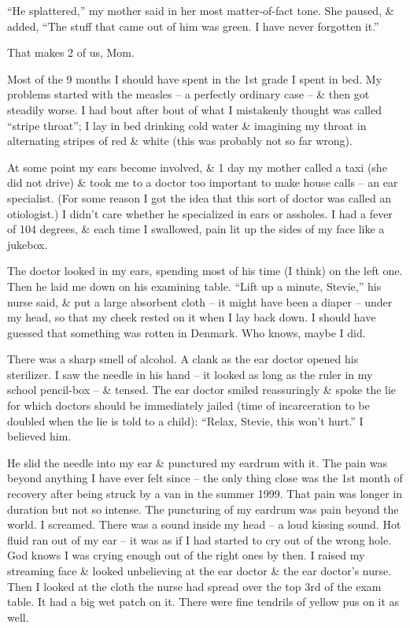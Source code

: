 \documentclass{article}
\numberwithin{equation}{section}
\begin{document}
``He splattered,'' my mother said in her most matter-of-fact tone. She paused, \& added, ``The stuff that came out of him was green. I have never forgotten it.''

That makes 2 of us, Mom.

 Most of the 9 months I should have spent in the 1st grade I spent in bed. My problems started with the measles -- a perfectly ordinary case -- \& then got steadily worse. I had bout after bout of what I mistakenly thought was called ``stripe throat''; I lay in bed drinking cold water \& imagining my throat in alternating stripes of red \& white (this was probably not so far wrong).

At some point my ears become involved, \& 1 day my mother called a taxi (she did not drive) \& took me to a doctor too important to make house calls -- an ear specialist. (For some reason I got the idea that this sort of doctor was called an otiologist.) I didn't care whether he specialized in ears or assholes. I had a fever of 104 degrees, \& each time I swallowed, pain lit up the sides of my face like a jukebox.

The doctor looked in my ears, spending most of his time (I think) on the left one. Then he laid me down on his examining table. ``Lift up a minute, Stevie,'' his nurse said, \& put a large absorbent cloth -- it might have been a diaper -- under my head, so that my cheek rested on it when I lay back down. I should have guessed that something was rotten in Denmark. Who knows, maybe I did.

There was a sharp smell of alcohol. A clank as the ear doctor opened his sterilizer. I saw the needle in his hand -- it looked as long as the ruler in my school pencil-box -- \& tensed. The ear doctor smiled reassuringly \& spoke the lie for which doctors should be immediately jailed (time of incarceration to be doubled when the lie is told to a child): ``Relax, Stevie, this won't hurt.'' I believed him.

He slid the needle into my ear \& punctured my eardrum with it. The pain was beyond anything I have ever felt since -- the only thing close was the 1st month of recovery after being struck by a van in the summer 1999. That pain was longer in duration but not so intense. The puncturing of my eardrum was pain beyond the world. I screamed. There was a sound inside my head -- a loud kissing sound. Hot fluid ran out of my ear -- it was as if I had started to cry out of the wrong hole. God knows I was crying enough out of the right ones by then. I raised my streaming face \& looked unbelieving at the ear doctor \& the ear doctor's nurse. Then I looked at the cloth the nurse had spread over the top 3rd of the exam table. It had a big wet patch on it. There were fine tendrils of yellow pus on it as well.
\end{document}
